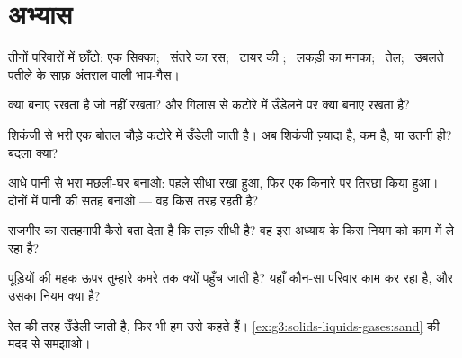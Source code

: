 \section{अभ्यास}

\begin{exercise}[$\star$]\label{exo:g3:solids-liquids-gases:1}
तीनों परिवारों में छाँटो: एक सिक्का; \ संतरे का रस; \ टायर की ;
\ लकड़ी का मनका; \ तेल; \ उबलते पतीले के साफ़ अंतराल वाली भाप-गैस।
\end{exercise}

\begin{exercise}[$\star$]\label{exo:g3:solids-liquids-gases:2}
 क्या बनाए रखता है जो  नहीं रखता? और गिलास से कटोरे में
उँडेलने पर  क्या बनाए रखता है?
\end{exercise}

\begin{exercise}[$\star$]\label{exo:g3:solids-liquids-gases:3}
शिकंजी से भरी एक बोतल चौड़े कटोरे में उँडेली जाती है। अब शिकंजी
ज़्यादा है, कम है, या उतनी ही? बदला क्या?
\end{exercise}

\begin{exercise}[$\star$]\label{exo:g3:solids-liquids-gases:4}
आधे पानी से भरा मछली-घर बनाओ: पहले सीधा रखा हुआ, फिर एक किनारे पर
तिरछा किया हुआ। दोनों में पानी की सतह बनाओ --- वह किस तरह रहती है?
\end{exercise}

\begin{exercise}[$\star$]\label{exo:g3:solids-liquids-gases:5}
राजगीर का सतहमापी कैसे बता देता है कि ताक़ सीधी है? वह इस अध्याय के
किस नियम को काम में ले रहा है?
\end{exercise}

\begin{exercise}[$\star$]\label{exo:g3:solids-liquids-gases:6}
पूड़ियों की महक ऊपर तुम्हारे कमरे तक क्यों पहुँच जाती है? यहाँ कौन-सा
परिवार काम कर रहा है, और उसका नियम क्या है?
\end{exercise}

\begin{exercise}[$\star$]\label{exo:g3:solids-liquids-gases:7}
रेत  की तरह उँडेली जाती है, फिर भी हम उसे  कहते हैं।
\cref{ex:g3:solids-liquids-gases:sand} की मदद से समझाओ।
\end{exercise}

